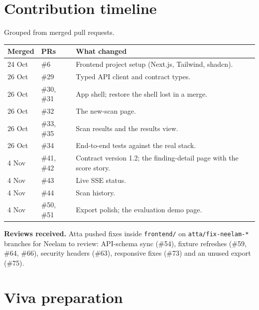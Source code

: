 \section{Contribution timeline}
Grouped from merged pull requests.
\begin{center}\small
\begin{tabularx}{\linewidth}{@{}llX@{}}
\toprule
Merged & PRs & What changed\\
\midrule
24 Oct & \#6 & Frontend project setup (Next.js, Tailwind, shadcn).\\
26 Oct & \#29 & Typed API client and contract types.\\
26 Oct & \#30, \#31 & App shell; restore the shell lost in a merge.\\
26 Oct & \#32 & The new-scan page.\\
26 Oct & \#33, \#35 & Scan results and the results view.\\
26 Oct & \#34 & End-to-end tests against the real stack.\\
4 Nov & \#41, \#42 & Contract version 1.2; the finding-detail page with the score story.\\
4 Nov & \#43 & Live SSE status.\\
4 Nov & \#44 & Scan history.\\
4 Nov & \#50, \#51 & Export polish; the evaluation demo page.\\
\bottomrule
\end{tabularx}
\end{center}
\textbf{Reviews received.} Atta pushed fixes inside \texttt{frontend/} on
\texttt{atta/fix-neelam-*} branches for Neelam to review: API-schema sync
(\#54), fixture refreshes (\#59, \#64, \#66), security headers (\#63),
responsive fixes (\#73) and an unused export (\#75).

\section{Viva preparation}
